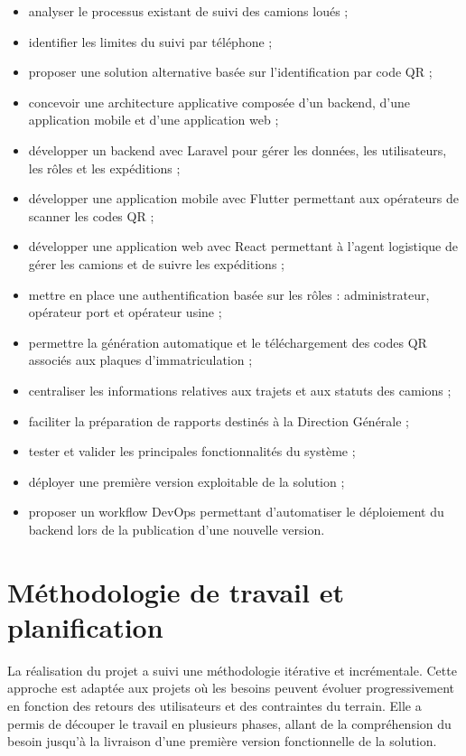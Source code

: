 \begin{itemize}
    \item analyser le processus existant de suivi des camions loués ;
    \item identifier les limites du suivi par téléphone ;
    \item proposer une solution alternative basée sur l'identification par code QR ;
    \item concevoir une architecture applicative composée d'un backend, d'une application mobile et d'une application web ;
    \item développer un backend avec Laravel pour gérer les données, les utilisateurs, les rôles et les expéditions ;
    \item développer une application mobile avec Flutter permettant aux opérateurs de scanner les codes QR ;
    \item développer une application web avec React permettant à l'agent logistique de gérer les camions et de suivre les expéditions ;
    \item mettre en place une authentification basée sur les rôles : administrateur, opérateur port et opérateur usine ;
    \item permettre la génération automatique et le téléchargement des codes QR associés aux plaques d'immatriculation ;
    \item centraliser les informations relatives aux trajets et aux statuts des camions ;
    \item faciliter la préparation de rapports destinés à la Direction Générale ;
    \item tester et valider les principales fonctionnalités du système ;
    \item déployer une première version exploitable de la solution ;
    \item proposer un workflow DevOps permettant d'automatiser le déploiement du backend lors de la publication d'une nouvelle version.
\end{itemize}

\section{Méthodologie de travail et planification}

La réalisation du projet a suivi une méthodologie itérative et incrémentale. Cette approche est adaptée aux projets où les besoins peuvent évoluer progressivement en fonction des retours des utilisateurs et des contraintes du terrain. Elle a permis de découper le travail en plusieurs phases, allant de la compréhension du besoin jusqu'à la livraison d'une première version fonctionnelle de la solution.

